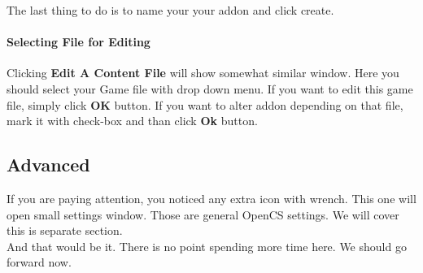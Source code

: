 The last thing to do is to name your your addon and click create.

\paragraph{Selecting File for Editing}
Clicking \textbf{Edit A Content File} will show somewhat similar window. Here you should select your Game file with drop down menu. If you want to edit this game file, simply click \textbf{OK} button. If you want to alter addon depending on that file, mark it with check-box and than click \textbf{Ok} button.

\subsection{Advanced}
If you are paying attention, you noticed any extra icon with wrench. This one will open small settings window. Those are general OpenCS settings. We will cover this is separate section.\\

And that would be it. There is no point spending more time here. We should go forward now.
